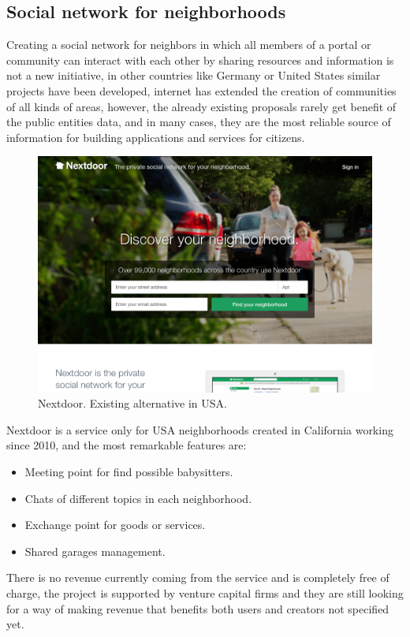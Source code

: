 \documentclass{DeustoFDP}
\begin{document}
\subsection{Social network for neighborhoods}
Creating a social network for neighbors in which all members of a portal or community can interact with each other by sharing resources and information is not a new initiative, in other countries like Germany or United States similar projects \cite{larazon} have been developed, internet has extended the creation of communities of all kinds of areas, however, the already existing proposals rarely get benefit of the public entities data, and in many cases, they are the most reliable source of information for building applications and services for citizens.

\begin{figure}[H]
\centering
\includegraphics[width=0.7\linewidth]{fig/nextdoor}
\caption[Nextdoor]{Nextdoor. Existing alternative in USA.}
\label{fig:nextdoor}
\end{figure}
Nextdoor is a service only for USA neighborhoods created in California working since 2010, and the most remarkable features are:

\begin{itemize}
	\item Meeting point for find possible babysitters.
	\item Chats of different topics in each neighborhood.
	\item Exchange point for goods or services.
	\item Shared garages management.
\end{itemize}

There is no revenue currently coming from the service and is completely free of charge, the project is supported by venture capital firms and they are still looking for a way of making revenue that benefits both users and creators not specified yet.
 
\end{document}
